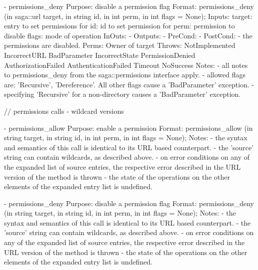 \begin{myspec}
 
    - permissions_deny
      Purpose:  disable a permission flag
      Format:   permissions_deny     (in  saga::url target, 
                                      in  string    id,
                                      in  int       perm,
                                      in  int       flags = None);
      Inputs:   target:               entry to set permissions for
                id:                   id to set permission for
                perm:                 permission to disable
                flags:                mode of operation
      InOuts:   -
      Outputs:  -
      PreCond:  -
      PostCond: - the permissions are disabled.
      Perms:    Owner of target
      Throws:   NotImplemented
                IncorrectURL
                BadParameter
                IncorrectState
                PermissionDenied
                AuthorizationFailed
                AuthenticationFailed
                Timeout
                NoSuccess
      Notes:    - all notes to permissions_deny from the
                  saga::permissions interface apply.
                - allowed flags are: 'Recursive', 'Dereference'.
                  All other flags cause a 'BadParameter'
                  exception.
                - specifying 'Recursive' for a non-directory
                  causes a 'BadParameter' exception.
 
 
    // permissions calls - wildcard versions
 
    - permissions_allow
      Purpose:  enable a permission 
      Format:   permissions_allow    (in  string  target, 
                                      in  string  id,
                                      in  int     perm, 
                                      in  int     flags = None);
      Notes:    - the syntax and semantics of this call is 
                  identical to its URL based counterpart.  
                - the 'source' string can contain wildcards, as
                  described above.
                - on error conditions on any of the expanded 
                  list of source entries, the respective error 
                  described in the URL version of the method is 
                  thrown - the state of the operations on the 
                  other elements of the expanded entry list is 
                  undefined.
 
 
    - permissions_deny
      Purpose:  disable a permission flag
      Format:   permissions_deny     (in  string  target, 
                                      in  string  id,
                                      in  int     perm,
                                      in  int     flags = None);
      Notes:    - the syntax and semantics of this call is 
                  identical to its URL based counterpart.  
                - the 'source' string can contain wildcards, as
                  described above.
                - on error conditions on any of the expanded 
                  list of source entries, the respective error 
                  described in the URL version of the method is 
                  thrown - the state of the operations on the 
                  other elements of the expanded entry list is 
                  undefined.
 \end{myspec}
 
